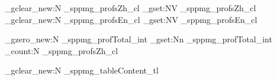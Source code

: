 \documentclass[class=NTOU_thesis, crop=false, float=true]{standalone}
\begin{document}
\ExplSyntaxOn
\BgThispage
\clist_gclear_new:N \g_sppmg_profsZh_cl
\clist_gset:NV \g_sppmg_profsZh_cl \profsZh
\clist_gclear_new:N \g_sppmg_profsEn_cl
\clist_gset:NV \g_sppmg_profsEn_cl \profsEn

\int_gzero_new:N \g_sppmg_profTotal_int 
\int_gset:Nn \g_sppmg_profTotal_int {\clist_count:N \g_sppmg_profsZh_cl} 

\tl_gclear_new:N \g_sppmg_tableContent_tl


\ExplSyntaxOff

\def\fsUniversity{\fontsize{38}{38}\selectfont }
\def\fsDeptZh{\fontsize{28}{28}\selectfont }
\def\fsDeptEn{\fontsize{14}{14}\selectfont }
\def\fsTitle{\fontsize{22}{22}\selectfont }
\def\fsNames{\fontsize{22}{22}\selectfont }
\end{document}
